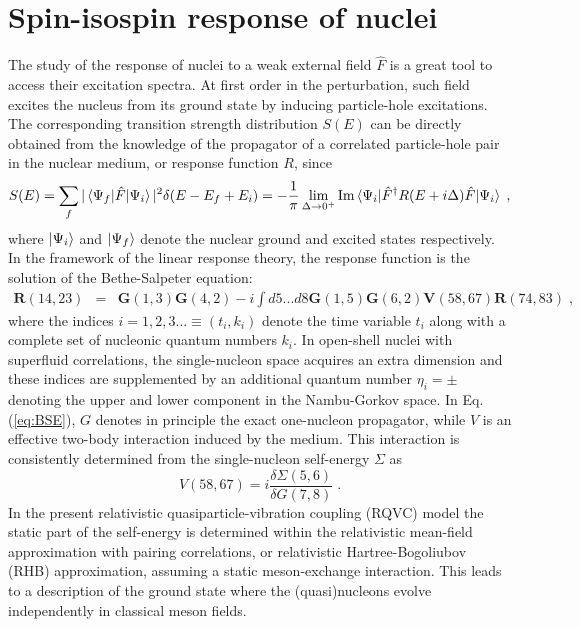 \documentclass{PoS}
\begin{document}
\section{Spin-isospin response of nuclei}
The study of the response of nuclei to a weak external field $\hat F$ is a great tool to access their excitation spectra.
At first order in the perturbation, such field excites the nucleus from its ground state by inducing particle-hole excitations. 
The corresponding transition strength distribution $S(E)$ can be directly obtained from the knowledge of the propagator of a correlated particle-hole pair in the nuclear medium, or response function $R$, since
%
\begin{eqnarray}
S(E) = \sum_f |\braket{\Psi_f|\hat F|\Psi_i}|^2 \delta (E-E_f+E_i) 
        = -\frac{1}{\pi} \lim_{\Delta\rightarrow 0^+} \mbox{Im} \braket{\Psi_i| \hat{F}^\dagger R(E+i\Delta) \hat F |\Psi_i} \; ,
\label{eq:strength}
\end{eqnarray}
where $\ket{\Psi_i}$ and $\ket{\Psi_f}$ denote the nuclear ground and excited states respectively. In the framework of the linear response theory, the response function is the solution of the Bethe-Salpeter equation:
%
\begin{eqnarray}
\boldsymbol{R}(14,23) &=& \boldsymbol{G}(1,3) \boldsymbol{G}(4,2) -i \int d5... d8 \boldsymbol{G}(1,5) \boldsymbol{G}(6,2) \boldsymbol{V}(58,67) \boldsymbol{R}(74,83) \; ,\label{eq:BSE}
\end{eqnarray}
where the indices $i=1,2,3...\equiv(t_i,k_i)$ denote the time variable $t_i$ along with a complete set of nucleonic quantum numbers $k_i$. 
In open-shell nuclei with superfluid correlations, the single-nucleon space acquires an extra dimension and these indices are supplemented by an additional quantum number $\eta_i=\pm$ denoting the upper and lower component in the Nambu-Gorkov space.
In Eq. (\ref{eq:BSE}), $G$ denotes in principle the exact one-nucleon propagator, while $V$ is an effective two-body interaction induced by the medium. This interaction is consistently determined from the single-nucleon self-energy $\Sigma$ as
\begin{equation}
V(58,67) = i \frac{\delta \Sigma(5,6)}{\delta G(7,8)} \; .
\end{equation}
In the present relativistic quasiparticle-vibration coupling (RQVC) model the static part of the self-energy is determined within the relativistic mean-field approximation with pairing correlations, or relativistic Hartree-Bogoliubov (RHB) approximation, assuming a static meson-exchange interaction. This leads to a description of the ground state where the (quasi)nucleons evolve independently in classical meson fields. 
\end{document}
